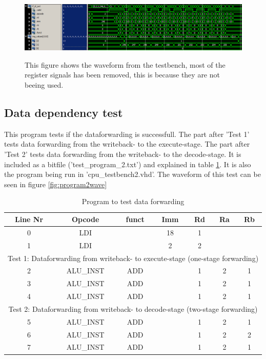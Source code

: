 \documentclass[11pt]{report}
\begin{document}
\begin{figure}
  \centering
  \includegraphics[width=.95\linewidth]{test1.png} \\
  \caption{This figure shows the waveform from the testbench, 
  most of the register signals has been removed, this is because they are not beeing used.}
  \label{fig:program1wave}
\end{figure}


\subsection*{Data dependency test}

This program tests if the dataforwarding is successfull. The part after 'Test 1' tests data forwarding
from the writeback- to the execute-stage. The part after 'Test 2' tests data forwarding from the
writeback- to the decode-stage. It is included as a bitfile ('test\_program\_2.txt') and explained
in table \ref{tab:program2table}. It is also the program being run in 'cpu\_testbench2.vhd'.
The waveform of this test can be seen in figure \ref{fig:program2wave}

\begin{table}[htbp]
  \centering
  \begin{tabular}{|c|c|c|c|c|c|c|}
    \hline
    Line Nr &	Opcode		&	funct	&	Imm	&	Rd	&	Ra	&	Rb	\\\hline
    	0	&	LDI			&			&	18	&	1	&		&		\\\hline
    	1	&	LDI			&			&	2	&	2	&		&		\\\hline
	\multicolumn{7}{|c|}{Test 1: Dataforwarding from writeback- to execute-stage (one-stage forwarding)}\\\hline
    	2	&	ALU\_INST	&	ADD		&		&	1	&	2	&	1	\\\hline
    	3	&	ALU\_INST	&	ADD		&		&	1	&	2	&	1	\\\hline
    	4	&	ALU\_INST	&	ADD		&		&	1	&	2	&	1	\\\hline
	\multicolumn{7}{|c|}{Test 2: Dataforwarding from writeback- to decode-stage (two-stage forwarding)}\\\hline
    	5	&	ALU\_INST	&	ADD		&		&	1	&	2	&	1	\\\hline
    	6	&	ALU\_INST	&	ADD		&		&	1	&	2	&	2	\\\hline
    	7	&	ALU\_INST	&	ADD		&		&	1	&	2	&	1	\\\hline
  \end{tabular}
  \caption{Program to test data forwarding}
  \label{tab:program2table}
\end{table}
\end{document}
